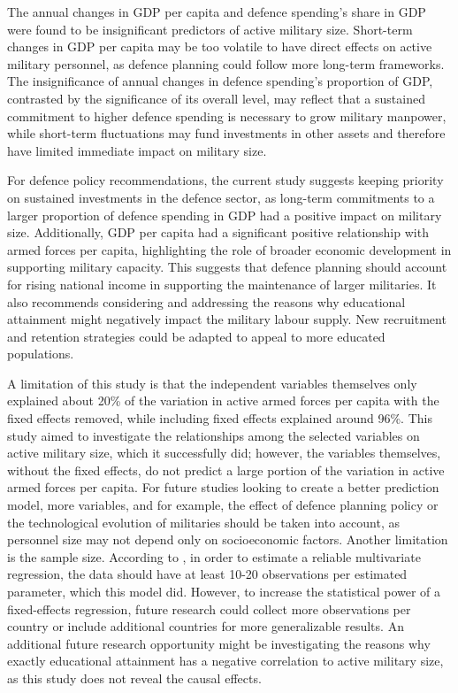 The annual changes in GDP per capita and defence spending's share in GDP were found to be insignificant predictors of active military size. 
Short-term changes in GDP per capita may be too volatile to have direct effects on active military personnel, as defence planning could follow more long-term frameworks. 
The insignificance of annual changes in defence spending's proportion of GDP, contrasted by the significance of its overall level, may reflect that a sustained commitment to higher defence spending is necessary to grow military manpower, while short-term fluctuations may fund investments in other assets and therefore have limited immediate impact on military size.

For defence policy recommendations, the current study suggests keeping priority on sustained investments in the defence sector, as long-term commitments to a larger proportion of defence spending in GDP had a positive impact on military size. 
Additionally, GDP per capita had a significant positive relationship with armed forces per capita, highlighting the role of broader economic development in supporting military capacity. 
This suggests that defence planning should account for rising national income in supporting the maintenance of larger militaries.
It also recommends considering and addressing the reasons why educational attainment might negatively impact the military labour supply. 
New recruitment and retention strategies could be adapted to appeal to more educated populations.

A limitation of this study is that the independent variables themselves only explained about 20\% of the variation in active armed forces per capita with the fixed effects removed, while including fixed effects explained around 96\%.
This study aimed to investigate the relationships among the selected variables on active military size, which it successfully did; however, the variables themselves, without the fixed effects, do not predict a large portion of the variation in active armed forces per capita. 
For future studies looking to create a better prediction model, more variables, and for example, the effect of defence planning policy or the technological evolution of militaries should be taken into account, as personnel size may not depend only on socioeconomic factors.
Another limitation is the sample size. According to \textcite{harrell_multivariable_2015}, in order to estimate a reliable multivariate regression, the data should have at least 10-20 observations per estimated parameter, which this model did. 
However, to increase the statistical power of a fixed-effects regression, future research could collect more observations per country or include additional countries for more generalizable results.
An additional future research opportunity might be investigating the reasons why exactly educational attainment has a negative correlation to active military size, as this study does not reveal the causal effects.